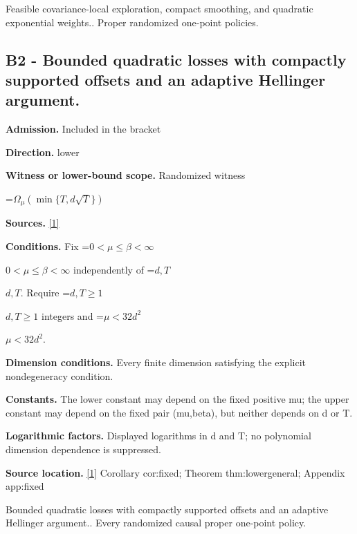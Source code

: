 \documentclass[10pt,a4paper]{article}
\newcommand{\AtlasMath}[1]{\par\begingroup\centering\setbox0=\hbox{$\displaystyle #1$}\ifdim\wd0>1.4\linewidth\typeout{ATLAS WIDE FORMULA: \the\wd0}\fi\ifdim\wd0>\linewidth\resizebox{\linewidth}{!}{\box0}\else\box0\fi\par\endgroup}
\newcommand{\AtlasInlineMath}[1]{\begingroup\setbox0=\hbox{$#1$}\ifdim\wd0>.4\linewidth\endgroup\AtlasMath{#1}\else\endgroup$#1$\fi}
\begin{document}
Feasible covariance-local exploration, compact smoothing, and quadratic exponential weights.. Proper randomized one-point policies.



\subsection{B2 - Bounded quadratic losses with compactly supported offsets and an adaptive Hellinger argument.}


\textbf{Admission.} Included in the bracket



\textbf{Direction.} lower



\textbf{Witness or lower-bound scope.} Randomized witness



\AtlasMath{\Omega_{\mu}\!\left(\min\{T,d\sqrt T\}\right)}


\textbf{Sources.} \href{https://github.com/WU-Wendao/Colombo/blob/main/colombo_sensorium/Complexity_altas/data/sources/colombo/U01/manuscript.pdf}{[1]}



\textbf{Conditions.} Fix \AtlasInlineMath{0<\mu\le\beta<\infty} independently of \AtlasInlineMath{d,T}. Require \AtlasInlineMath{d,T\ge1} integers and \AtlasInlineMath{\mu<32d^2}.



\textbf{Dimension conditions.} Every finite dimension satisfying the explicit nondegeneracy condition.



\textbf{Constants.} The lower constant may depend on the fixed positive mu; the upper constant may depend on the fixed pair (mu,beta), but neither depends on d or T.



\textbf{Logarithmic factors.} Displayed logarithms in d and T; no polynomial dimension dependence is suppressed.



\textbf{Source location.} \href{https://github.com/WU-Wendao/Colombo/blob/main/colombo_sensorium/Complexity_altas/data/sources/colombo/U01/manuscript.pdf}{[1]} Corollary cor:fixed; Theorem thm:lowergeneral; Appendix app:fixed



Bounded quadratic losses with compactly supported offsets and an adaptive Hellinger argument.. Every randomized causal proper one-point policy.
\end{document}
